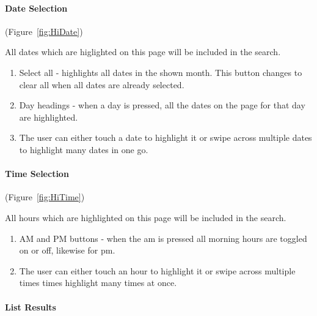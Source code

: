 \paragraph{Date Selection}

(Figure~\ref{fig:HiDate})


All dates which are higlighted on this page will be included in the
search.
\begin{enumerate}
	\item Select all - highlights all dates in the shown month. This button
	      changes to clear all when all dates are already selected.
	\item Day headings - when a day is pressed, all the dates on the page for
	      that day are highlighted.
	\item The user can either touch a date to highlight it or swipe across multiple
	      dates to highlight many dates in one go.
\end{enumerate}

\paragraph{Time Selection}

(Figure~\ref{fig:HiTime})


All hours which are highlighted on this page will be included in the
search.
\begin{enumerate}
	\item AM and PM buttons - when the am is pressed all morning hours are toggled
	      on or off, likewise for pm.
	\item The user can either touch an hour to highlight it or swipe across
	      multiple times times highlight many times at once.
\end{enumerate}

\paragraph{List Results}

